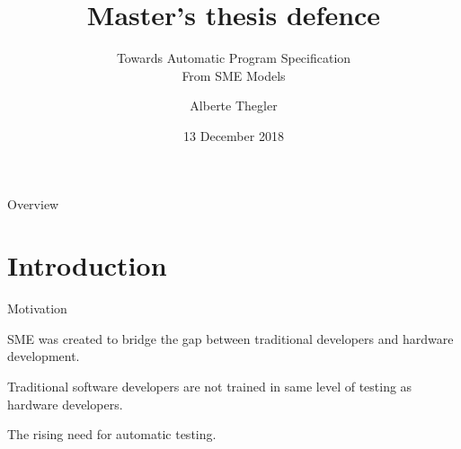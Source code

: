 \documentclass[11pt]{beamer}
\title{Master's thesis defence}
\subtitle{Towards Automatic Program Specification \\ From SME Models}
\author{Alberte Thegler}
\institute[Niels Bohr Institute]{Niels Bohr Institute, University of Copenhagen, Denmark}
\date[December 13, 2018]{13 December 2018}
\begin{document}
\frame[plain]{\titlepage}


\begin{frame}{Overview}
\tableofcontents
\end{frame}

\section{Introduction}

\begin{frame}{Motivation}
  \begin{block}{}
    SME was created to bridge the gap between traditional developers and hardware development.
  \end{block}

  \pause

  \begin{block}{}
     Traditional software developers are not trained in same level of testing as hardware developers.
  \end{block}

  \pause

  \begin{block}{}
     The rising need for automatic testing.
  \end{block}
\end{frame}
\end{document}
